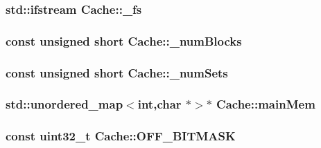 \hypertarget{class_cache_acf30051e72f4bd049a378a1248036bea}{
\subsubsection[{\-\_\-fs}]{\setlength{\rightskip}{0pt plus 5cm}std\-::ifstream {\bf Cache\-::\-\_\-fs}}}\label{class_cache_acf30051e72f4bd049a378a1248036bea}
\hypertarget{class_cache_aedf1134f3281104ebb38268579a50ce3}{
\subsubsection[{\-\_\-num\-Blocks}]{\setlength{\rightskip}{0pt plus 5cm}const unsigned short {\bf Cache\-::\-\_\-num\-Blocks}}}\label{class_cache_aedf1134f3281104ebb38268579a50ce3}
\hypertarget{class_cache_a7f279c793a54d916e233aab499ffb496}{
\subsubsection[{\-\_\-num\-Sets}]{\setlength{\rightskip}{0pt plus 5cm}const unsigned short {\bf Cache\-::\-\_\-num\-Sets}}}\label{class_cache_a7f279c793a54d916e233aab499ffb496}
\hypertarget{class_cache_a2c6c646ab22036ab0df36809fa7d5ab1}{
\subsubsection[{main\-Mem}]{\setlength{\rightskip}{0pt plus 5cm}std\-::unordered\-\_\-map$<$int,char $\ast$$>$$\ast$ {\bf Cache\-::main\-Mem}}}\label{class_cache_a2c6c646ab22036ab0df36809fa7d5ab1}
\hypertarget{class_cache_a6ba6b28609e0f72dbb04101599f99df0}{
\subsubsection[{O\-F\-F\-\_\-\-B\-I\-T\-M\-A\-S\-K}]{\setlength{\rightskip}{0pt plus 5cm}const uint32\-\_\-t {\bf Cache\-::\-O\-F\-F\-\_\-\-B\-I\-T\-M\-A\-S\-K}}}\label{class_cache_a6ba6b28609e0f72dbb04101599f99df0}
